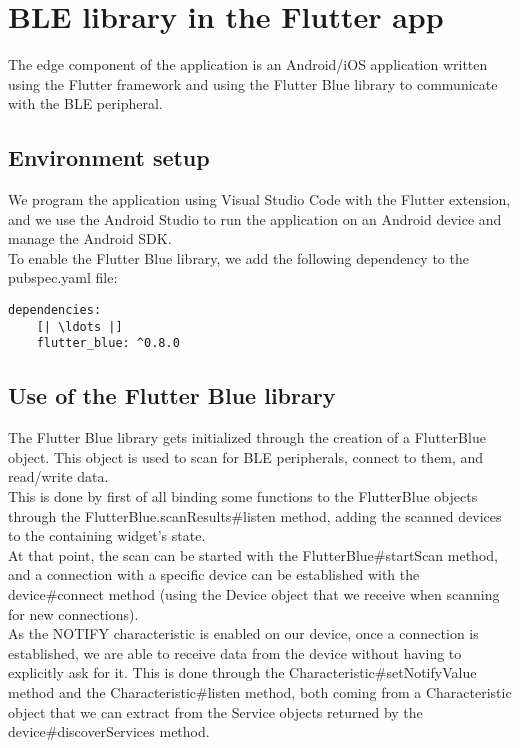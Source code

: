 \section{BLE library in the Flutter app}
The edge component of the application is an Android/iOS application written using
the Flutter framework\cite{b4} and using the Flutter Blue library\cite{b5} to communicate
with the BLE peripheral.
\subsection{Environment setup}
We program the application using Visual Studio Code with the Flutter extension, and
we use the Android Studio to run the application on an Android device and manage the
Android SDK. \\
To enable the Flutter Blue library, we add the following dependency to the pubspec.yaml file:
\begin{lstlisting}
dependencies:
    [| \ldots |]
    flutter_blue: ^0.8.0
\end{lstlisting}

\subsection{Use of the Flutter Blue library}
The Flutter Blue library gets initialized through the creation of a FlutterBlue object.
This object is used to scan for BLE peripherals, connect to them, and read/write data. \\

This is done by first of all binding some functions to the FlutterBlue objects through
the FlutterBlue.scanResults\#listen method, adding the scanned devices to the containing
widget's state. \\

At that point, the scan can be started with the FlutterBlue\#startScan method, and
a connection with a specific device can be established with the device\#connect
method (using the Device object that we receive when scanning for new connections). \\

As the NOTIFY characteristic is enabled on our device, once a connection is established,
we are able to receive data from the device without having to explicitly ask for it.
This is done through the Characteristic\#setNotifyValue method and the Characteristic\#listen
method, both coming from a Characteristic object that we can extract from the Service
objects returned by the device\#discoverServices method. \\